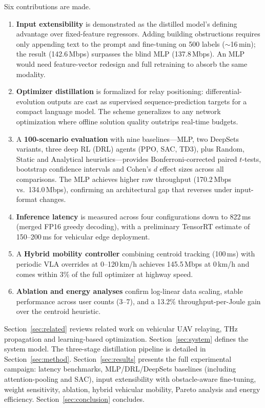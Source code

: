 \documentclass[journal]{IEEEtran}
\begin{document}
Six contributions are made.
\begin{enumerate}
    \item \textbf{Input extensibility} is demonstrated as the distilled model's defining advantage over fixed-feature regressors. Adding building obstructions requires only appending text to the prompt and fine-tuning on 500 labels (${\sim}$16\,min); the result (142.6\,Mbps) surpasses the blind MLP (137.8\,Mbps). An MLP would need feature-vector redesign and full retraining to absorb the same modality.

    \item \textbf{Optimizer distillation} is formalized for relay positioning: differential-evolution outputs are cast as supervised sequence-prediction targets for a compact language model. The scheme generalizes to any network optimization where offline solution quality outstrips real-time budgets.

    \item A \textbf{100-scenario evaluation} with nine baselines---MLP, two DeepSets variants, three deep RL (DRL) agents (PPO, SAC, TD3), plus Random, Static and Analytical heuristics---provides Bonferroni-corrected paired $t$-tests, bootstrap confidence intervals and Cohen's $d$ effect sizes across all comparisons. The MLP achieves higher raw throughput (170.2\,Mbps vs.\ 134.0\,Mbps), confirming an architectural gap that reverses under input-format changes.

    \item \textbf{Inference latency} is measured across four configurations down to 822\,ms (merged FP16 greedy decoding), with a preliminary TensorRT estimate of 150--200\,ms for vehicular edge deployment.

    \item A \textbf{Hybrid mobility controller} combining centroid tracking (100\,ms) with periodic VLA overrides at 0--120\,km/h achieves 145.5\,Mbps at 0\,km/h and comes within 3\% of the full optimizer at highway speed.

    \item \textbf{Ablation and energy analyses} confirm log-linear data scaling, stable performance across user counts (3--7), and a 13.2\% throughput-per-Joule gain over the centroid heuristic.
\end{enumerate}

Section~\ref{sec:related} reviews related work on vehicular UAV relaying, THz propagation and learning-based optimization. Section~\ref{sec:system} defines the system model. The three-stage distillation pipeline is detailed in Section~\ref{sec:method}. Section~\ref{sec:results} presents the full experimental campaign: latency benchmarks, MLP/DRL/DeepSets baselines (including attention-pooling and SAC), input extensibility with obstacle-aware fine-tuning, weight sensitivity, ablation, hybrid vehicular mobility, Pareto analysis and energy efficiency. Section~\ref{sec:conclusion} concludes.
\end{document}
